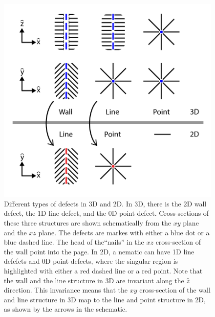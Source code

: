 \begin{figure}[h]
  \centering
  \includegraphics{figures/C2/Ch2-Figs_GenDef.png}
  \caption{Different types of defects in 3D and 2D.
  In 3D, there is the 2D wall defect, the 1D line defect, and the 0D point defect.
  Cross-sections of these three structures are shown schematically from the $xy$ plane and the $xz$ plane.
  The defects are markes with either a blue dot or a blue dashed line.
  The head of the``nails'' in the $xz$ cross-section of the wall point into the page.
  In 2D, a nematic can have 1D line defefcts and 0D point defects, where the singular region is highlighted with either a red dashed line or a red point.
  Note that the wall and the line structure in 3D are invariant along the $\hat{z}$ direction.
  This invariance means that the $xy$ cross-section of the wall and line structure in 3D map to the line and point structure in 2D, as shown by the arrows in the schematic.}\label{f:2-GenDef}
\end{figure}

